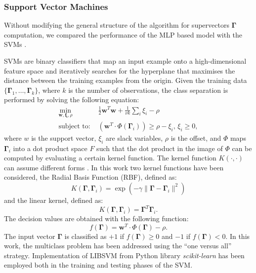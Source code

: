 \subsubsection{Support Vector Machines}

Without modifying the general structure of the algorithm for supervectors $\mathbf{\Gamma}$ computation, we compared the performance of the MLP based model with the SVMs \cite{hearst1998support}.

SVMs are binary classifiers that map an input example onto a high-dimensional feature space and iteratively searches for the hyperplane that maximises the distance between the training examples from the origin.  Given the training data $\{\mathbf{\Gamma}_{1},\dots,\mathbf{\Gamma}_{k}\}$, where $k$ is the number of observations, the class separation is performed by solving the following equation:
\begin{align}
\min_{\mathbf{w},\mathbf{\xi},\rho} & \frac{1}{2}\mathbf{w}^T\mathbf{w} + \frac{1}{\nu k}\sum_i \xi_i-\rho \\
\mbox{subject to: } & (\mathbf{w}^T \cdot \Phi(\mathbf{\Gamma}_i)) \ge \rho-\xi_i, \,  \xi_i \ge 0,
\end{align}
where $w$ is the support vector, $\xi_i$ are slack variables, $\rho$ is the offset, and $\Phi$ maps $\mathbf{\Gamma}_i$ into a dot product space $F$ such that the dot product in the image of $\Phi$ can be computed by evaluating a certain kernel function. The kernel function $K(\cdot, \cdot)$ can assume different forms \cite{bishop06}. In this work two kernel functions have been considered, the Radial Basis Function (RBF), defined as:
\begin{equation}
K(\mathbf{\Gamma},\mathbf{\Gamma}_{i}) = \exp(-\gamma \| \mathbf{\Gamma} - \mathbf{\Gamma}_{i}\|^2 )
\end{equation}
and the linear kernel, defined as:
\begin{equation}
K(\mathbf{\Gamma},\mathbf{\Gamma}_{i}) = \mathbf{\Gamma}^T\mathbf{\Gamma}_{i}.
\end{equation}
The decision values are obtained with the following function:
\begin{equation}
\label{eq:hyper}
f(\mathbf{\Gamma}) = \mathbf{w}^T \cdot \Phi(\mathbf{\Gamma})-\rho.
\end{equation}
The input vector $\mathbf{\Gamma}$ is classified as $+1$ if $f(\mathbf{\Gamma}) \geq 0$ and $-1$ if  $f(\mathbf{\Gamma}) < 0$.
In this work, the multiclass problem has been addressed using the ``one versus all'' strategy. Implementation of LIBSVM \cite{chang11} from Python library \textit{scikit-learn} has been employed both in the training and testing phases of the SVM.

